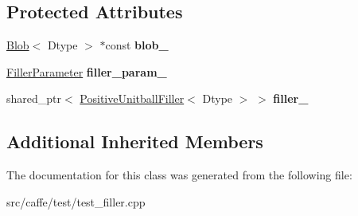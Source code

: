 \subsection*{Protected Attributes}
\begin{DoxyCompactItemize}
\item 
\mbox{\label{classcaffe_1_1_positive_unitball_filler_test_af19629fd3bf030416e99fb99560cc66f}} 
\mbox{\hyperlink{classcaffe_1_1_blob}{Blob}}$<$ Dtype $>$ $\ast$const {\bfseries blob\+\_\+}
\item 
\mbox{\label{classcaffe_1_1_positive_unitball_filler_test_ab669b2aa9520fc63000ce297306376b5}} 
\mbox{\hyperlink{classcaffe_1_1_filler_parameter}{Filler\+Parameter}} {\bfseries filler\+\_\+param\+\_\+}
\item 
\mbox{\label{classcaffe_1_1_positive_unitball_filler_test_ad3ebaf3b06c5ec22019b0e29c50b1dd5}} 
shared\+\_\+ptr$<$ \mbox{\hyperlink{classcaffe_1_1_positive_unitball_filler}{Positive\+Unitball\+Filler}}$<$ Dtype $>$ $>$ {\bfseries filler\+\_\+}
\end{DoxyCompactItemize}
\subsection*{Additional Inherited Members}


The documentation for this class was generated from the following file\+:\begin{DoxyCompactItemize}
\item 
src/caffe/test/test\+\_\+filler.\+cpp\end{DoxyCompactItemize}
